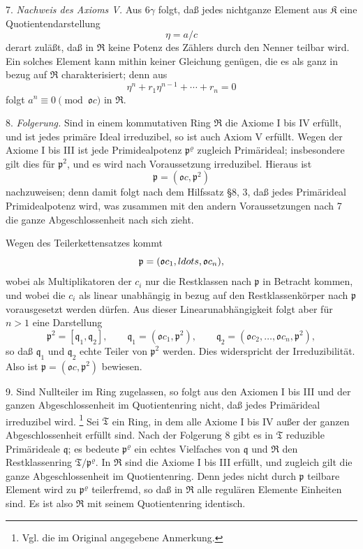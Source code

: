 \documentclass[11pt]{article}
\providecommand{\mR}{\mathfrak{R}}
\providecommand{\mK}{\mathfrak{K}}
\providecommand{\mT}{\mathfrak{T}}
\providecommand{\mo}{\mathfrak{o}}
\providecommand{\mpideal}{\mathfrak{p}}
\providecommand{\mq}{\mathfrak{q}}
\begin{document}
7. \emph{Nachweis des Axioms V.} Aus 6$\gamma$ folgt, daß jedes nichtganze Element aus $\mK$ eine Quotientendarstellung
\[
        \eta=a/c
\]
derart zuläßt, daß in $\mR$ keine Potenz des Zählers durch den Nenner teilbar wird. Ein solches Element kann mithin keiner Gleichung genügen, die es als ganz in bezug auf $\mR$ charakterisiert; denn aus
\[
        \eta^n+r_1\eta^{n-1}+\cdots+r_n=0
\]
folgt $a^n\equiv0\pmod{\mo c}$ in $\mR$.

8. \emph{Folgerung.} Sind in einem kommutativen Ring $\mR$ die Axiome I bis IV erfüllt, und ist jedes primäre Ideal irreduzibel, so ist auch Axiom V erfüllt. Wegen der Axiome I bis III ist jede Primidealpotenz $\mpideal^\varrho$ zugleich Primärideal; insbesondere gilt dies für $\mpideal^2$, und es wird nach Voraussetzung irreduzibel. Hieraus ist
\[
        \mpideal=(\mo c,\mpideal^2)
\]
nachzuweisen; denn damit folgt nach dem Hilfssatz §8, 3, daß jedes Primärideal Primidealpotenz wird, was zusammen mit den andern Voraussetzungen nach 7 die ganze Abgeschlossenheit nach sich zieht.

Wegen des Teilerkettensatzes kommt
\[
        \mpideal=(\mo c_1,\\ldots,\mo c_n),
\]
wobei als Multiplikatoren der $c_i$ nur die Restklassen nach $\mpideal$ in Betracht kommen, und wobei die $c_i$ als linear unabhängig in bezug auf den Restklassenkörper nach $\mpideal$ vorausgesetzt werden dürfen. Aus dieser Linearunabhängigkeit folgt aber für $n>1$ eine Darstellung
\[
        \mpideal^2=[\mq_1,\mq_2],
        \qquad \mq_1=(\mo c_1,\mpideal^2),
        \qquad \mq_2=(\mo c_2,\ldots,\mo c_n,\mpideal^2),
\]
so daß $\mq_1$ und $\mq_2$ echte Teiler von $\mpideal^2$ werden. Dies widerspricht der Irreduzibilität. Also ist $\mpideal=(\mo c,\mpideal^2)$ bewiesen.

9. Sind Nullteiler im Ring zugelassen, so folgt aus den Axiomen I bis III und der ganzen Abgeschlossenheit im Quotientenring nicht, daß jedes Primärideal irreduzibel wird.
\footnote{Vgl. die im Original angegebene Anmerkung.}
Sei $\mT$ ein Ring, in dem alle Axiome I bis IV außer der ganzen Abgeschlossenheit erfüllt sind. Nach der Folgerung 8 gibt es in $\mT$ reduzible Primärideale $\mq$; es bedeute $\mpideal^\varrho$ ein echtes Vielfaches von $\mq$ und $\mR$ den Restklassenring $\mT/\mpideal^\varrho$. In $\mR$ sind die Axiome I bis III erfüllt, und zugleich gilt die ganze Abgeschlossenheit im Quotientenring. Denn jedes nicht durch $\mpideal$ teilbare Element wird zu $\mpideal^\varrho$ teilerfremd, so daß in $\mR$ alle regulären Elemente Einheiten sind. Es ist also $\mR$ mit seinem Quotientenring identisch.
\end{document}
